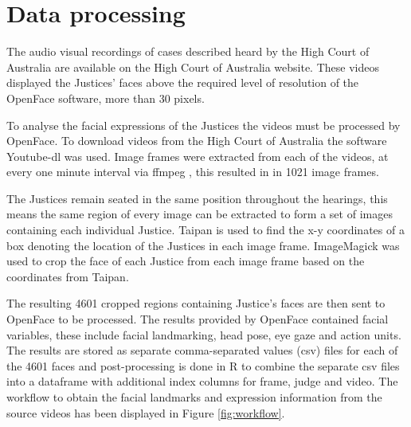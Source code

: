 \documentclass{monashthesis}
\begin{document}
\hypertarget{data-processing}{%
\section{Data processing}\label{data-processing}}

The audio visual recordings of cases described heard by the High Court of Australia \autocite{judicalguid} are available on the High Court of Australia website. These videos displayed the Justices' faces above the required level of resolution of the OpenFace software, more than 30 pixels.

To analyse the facial expressions of the Justices the videos must be processed by OpenFace. To download videos from the High Court of Australia \autocite{judicalguid} the software Youtube-dl \autocite{youtube-dl} was used. Image frames were extracted from each of the videos, at every one minute interval via ffmpeg \autocite{ffmpeg}, this resulted in in 1021 image frames.

The Justices remain seated in the same position throughout the hearings, this means the same region of every image can be extracted to form a set of images containing each individual Justice. Taipan \autocite{Taipan} is used to find the x-y coordinates of a box denoting the location of the Justices in each image frame. ImageMagick \autocite{ImageMagick} was used to crop the face of each Justice from each image frame based on the coordinates from Taipan.

The resulting 4601 cropped regions containing Justice's faces are then sent to OpenFace \autocite{baltrusaitis2018openface} to be processed. The results provided by OpenFace contained facial variables, these include facial landmarking, head pose, eye gaze and action units. The results are stored as separate comma-separated values (csv) files for each of the 4601 faces and post-processing is done in R to combine the separate csv files into a dataframe with additional index columns for frame, judge and video.
The workflow to obtain the facial landmarks and expression information from the source videos has been displayed in Figure \ref{fig:workflow}.
\end{document}

